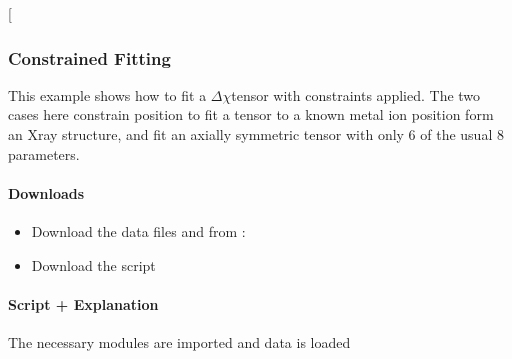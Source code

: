 \documentclass[a4paper,10pt,english,openany,oneside]{sphinxmanual}
\begin{document}
\sphinxAtStartPar
{} {[}\sphinxcode{\sphinxupquote{pcs\_fit\_models.png}}{]}

\noindent{}


\subsubsection{Constrained Fitting}
\label{\detokenize{examples/pcs_fit_constrained:constrained-fitting}}\label{\detokenize{examples/pcs_fit_constrained:pcs-fit-constrained}}\label{\detokenize{examples/pcs_fit_constrained::doc}}
\sphinxAtStartPar
This example shows how to fit a \({\Delta\chi}\)\sphinxhyphen{}tensor with constraints applied. The two cases here constrain position to fit a tensor to a known metal ion position form an X\sphinxhyphen{}ray structure, and fit an axially symmetric tensor with only 6 of the usual 8 parameters.


\paragraph{Downloads}
\label{\detokenize{examples/pcs_fit_constrained:downloads}}\begin{itemize}
\item {} 
\sphinxAtStartPar
Download the data files  and  from :

\item {} 
\sphinxAtStartPar
Download the script 

\end{itemize}


\paragraph{Script + Explanation}
\label{\detokenize{examples/pcs_fit_constrained:script-explanation}}
\sphinxAtStartPar
The necessary modules are imported and data is loaded

\begin{sphinxVerbatim}[commandchars=\\\{\}]
      

  
  
  
  
\end{sphinxVerbatim}
\end{document}
